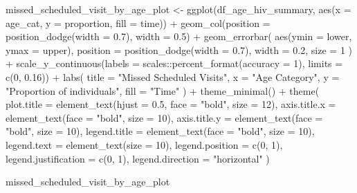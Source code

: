 \documentclass[
  letterpaper,
  DIV=11,
  numbers=noendperiod]{scrartcl}
\newenvironment{Shaded}{\begin{snugshade}}{\end{snugshade}}
\newcommand{\AttributeTok}[1]{\textcolor[rgb]{0.40,0.45,0.13}{#1}}
\newcommand{\DecValTok}[1]{\textcolor[rgb]{0.68,0.00,0.00}{#1}}
\newcommand{\FloatTok}[1]{\textcolor[rgb]{0.68,0.00,0.00}{#1}}
\newcommand{\FunctionTok}[1]{\textcolor[rgb]{0.28,0.35,0.67}{#1}}
\newcommand{\NormalTok}[1]{\textcolor[rgb]{0.00,0.23,0.31}{#1}}
\newcommand{\OtherTok}[1]{\textcolor[rgb]{0.00,0.23,0.31}{#1}}
\newcommand{\SpecialCharTok}[1]{\textcolor[rgb]{0.37,0.37,0.37}{#1}}
\newcommand{\StringTok}[1]{\textcolor[rgb]{0.13,0.47,0.30}{#1}}
\begin{document}
\begin{Shaded}
\begin{Highlighting}[]
\NormalTok{missed\_scheduled\_visit\_by\_age\_plot }\OtherTok{\textless{}{-}} \FunctionTok{ggplot}\NormalTok{(df\_age\_hiv\_summary, }\FunctionTok{aes}\NormalTok{(}\AttributeTok{x =}\NormalTok{ age\_cat, }\AttributeTok{y =}\NormalTok{ proportion, }\AttributeTok{fill =}\NormalTok{ time)) }\SpecialCharTok{+}
  \FunctionTok{geom\_col}\NormalTok{(}\AttributeTok{position =} \FunctionTok{position\_dodge}\NormalTok{(}\AttributeTok{width =} \FloatTok{0.7}\NormalTok{), }\AttributeTok{width =} \FloatTok{0.5}\NormalTok{) }\SpecialCharTok{+}
  \FunctionTok{geom\_errorbar}\NormalTok{(}
    \FunctionTok{aes}\NormalTok{(}\AttributeTok{ymin =}\NormalTok{ lower, }\AttributeTok{ymax =}\NormalTok{ upper),}
    \AttributeTok{position =} \FunctionTok{position\_dodge}\NormalTok{(}\AttributeTok{width =} \FloatTok{0.7}\NormalTok{),}
    \AttributeTok{width =} \FloatTok{0.2}\NormalTok{,}
    \AttributeTok{size =} \DecValTok{1}
\NormalTok{  ) }\SpecialCharTok{+}
  \FunctionTok{scale\_y\_continuous}\NormalTok{(}\AttributeTok{labels =}\NormalTok{ scales}\SpecialCharTok{::}\FunctionTok{percent\_format}\NormalTok{(}\AttributeTok{accuracy =} \DecValTok{1}\NormalTok{), }\AttributeTok{limits =} \FunctionTok{c}\NormalTok{(}\DecValTok{0}\NormalTok{, }\FloatTok{0.16}\NormalTok{)) }\SpecialCharTok{+}
  \FunctionTok{labs}\NormalTok{(}
    \AttributeTok{title =} \StringTok{"Missed Scheduled Visits"}\NormalTok{,}
    \AttributeTok{x =} \StringTok{"Age Category"}\NormalTok{,}
    \AttributeTok{y =} \StringTok{"Proportion of individuals"}\NormalTok{,}
    \AttributeTok{fill =} \StringTok{"Time"}
\NormalTok{  ) }\SpecialCharTok{+}
  \FunctionTok{theme\_minimal}\NormalTok{() }\SpecialCharTok{+}
  \FunctionTok{theme}\NormalTok{(}
    \AttributeTok{plot.title =} \FunctionTok{element\_text}\NormalTok{(}\AttributeTok{hjust =} \FloatTok{0.5}\NormalTok{, }\AttributeTok{face =} \StringTok{"bold"}\NormalTok{, }\AttributeTok{size =} \DecValTok{12}\NormalTok{),}
    \AttributeTok{axis.title.x =} \FunctionTok{element\_text}\NormalTok{(}\AttributeTok{face =} \StringTok{"bold"}\NormalTok{, }\AttributeTok{size =} \DecValTok{10}\NormalTok{),}
    \AttributeTok{axis.title.y =} \FunctionTok{element\_text}\NormalTok{(}\AttributeTok{face =} \StringTok{"bold"}\NormalTok{, }\AttributeTok{size =} \DecValTok{10}\NormalTok{),}
    \AttributeTok{legend.title =} \FunctionTok{element\_text}\NormalTok{(}\AttributeTok{face =} \StringTok{"bold"}\NormalTok{, }\AttributeTok{size =} \DecValTok{10}\NormalTok{),}
    \AttributeTok{legend.text =} \FunctionTok{element\_text}\NormalTok{(}\AttributeTok{size =} \DecValTok{10}\NormalTok{),}
    \AttributeTok{legend.position =} \FunctionTok{c}\NormalTok{(}\DecValTok{0}\NormalTok{, }\DecValTok{1}\NormalTok{),}
    \AttributeTok{legend.justification =} \FunctionTok{c}\NormalTok{(}\DecValTok{0}\NormalTok{, }\DecValTok{1}\NormalTok{),}
    \AttributeTok{legend.direction =} \StringTok{"horizontal"}
\NormalTok{  )}

\NormalTok{missed\_scheduled\_visit\_by\_age\_plot}
\end{Highlighting}
\end{Shaded}
\end{document}
